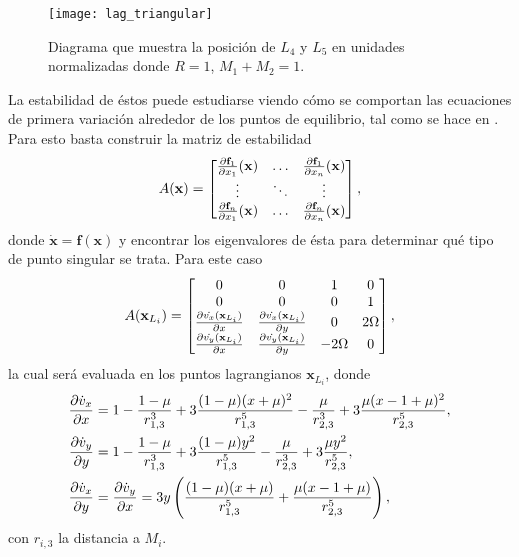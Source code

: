 \begin{figure}[h!]
 \centering
 \texttt{[image: lag\_triangular]}
 \caption{Diagrama que muestra la posición de $L_4$ y $L_5$ en unidades normalizadas donde $R=1$, $M_1 + M_2 = 1$.}
 \label{fig:L_diagram}
\end{figure}

La estabilidad de éstos puede estudiarse viendo cómo se comportan las ecuaciones de primera variación alrededor de los puntos de equilibrio, tal como se hace en \cite{Cornish1998}. Para esto basta construir la matriz de estabilidad 
\begin{equation*}
 A(\mathbf{x}) = \begin{bmatrix}
  \frac{\partial \mathbf{f}_1}{\partial x_1}(\mathbf{x}) & \dots & \frac{\partial \mathbf{f}_1}{\partial x_n}(\mathbf{x}) \\
  \vdots & \ddots & \vdots \\ 
  \frac{\partial \mathbf{f}_n}{\partial x_1}(\mathbf{x}) & \dots & \frac{\partial \mathbf{f}_n}{\partial x_n} (\mathbf{x})
\end{bmatrix},
\end{equation*}
donde $\dot{\mathbf{x}} = \mathbf{f}(\mathbf{x})$ y encontrar los eigenvalores de ésta para determinar qué tipo de punto singular se trata. Para este caso
\begin{equation}
 A(\mathbf{x}_{L_i}) = \begin{bmatrix}
  0 & 0 & 1 & 0 \\
  0 & 0 & 0 & 1 \\ 
  \frac{\partial \dot{v_x}(\mathbf{x}_{L_i})}{\partial x} & \frac{\partial \dot{v_x}(\mathbf{x}_{L_i})}{\partial y} & 0 & 2 \Omega \\
  \frac{\partial \dot{v_y}(\mathbf{x}_{L_i})}{\partial x} & \frac{\partial \dot{v_y}(\mathbf{x}_{L_i})}{\partial y} & -2\Omega & 0
\end{bmatrix},
\label{eq:stability_CR3BP}
\end{equation}
la cual será evaluada en los puntos lagrangianos $\mathbf{x}_{L_i}$, donde 
\begin{align}
 \frac{\partial \dot{v}_x}{\partial x} &=  1 - \frac{1-\mu}{r_{1,3}^3} + 3\frac{(1-\mu)(x + \mu)^2}{r_{1,3}^5} - \frac{\mu}{r_{2,3}^3} + 3\frac{\mu(x - 1 + \mu)^2}{r_{2,3}^5}, \nonumber \\ 
 \frac{\partial \dot{v}_y}{\partial y} &= 1 - \frac{1-\mu}{r_{1,3}^3} + 3\frac{(1-\mu)y^2}{r_{1,3}^5} - \frac{\mu}{r_{2,3}^3} + 3\frac{\mu y^2}{r_{2,3}^5}, \nonumber \\
 \frac{\partial \dot{v}_x}{\partial y} &= \frac{\partial \dot{v}_y}{\partial x} = 3 y \left( \frac{(1-\mu)(x+\mu)}{r_{1,3}^5} + \frac{\mu (x - 1 + \mu)}{r_{2,3}^5} \right),
 \label{eq:3body_stability}
\end{align}
con $r_{i,3}$ la distancia a $M_i$.

